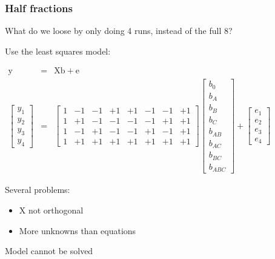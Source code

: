 \begin{frame}\frametitle{Half fractions}

	What do we loose by only doing 4 runs, instead of the full 8?

	Use the least squares model:

	$
	\begin{array}{rcl}
		\mathrm{y} &=& \mathrm{X} \mathrm{b} + \mathrm{e}\\
		\begin{bmatrix}
			y_1\\
			y_2\\
			y_3 \\
			y_4
		\end{bmatrix}
		&=&
		\begin{bmatrix}
			1 & -1 & -1 & +1 & +1 & -1 & -1 & +1\\
			1 & +1 & -1 & -1 & -1 & -1 & +1 & +1\\
			1 & -1 & +1 & -1 & -1 & +1 & -1 & +1\\
			1 & +1 & +1 & +1 & +1 & +1 & +1 & +1
		\end{bmatrix}
		\begin{bmatrix}
			b_0 \\
			b_A \\
			b_B \\
			b_{C} \\
			b_{AB} \\
			b_{AC} \\
			b_{BC} \\
			b_{ABC}
		\end{bmatrix}
		+
		\begin{bmatrix}
			e_1\\
			e_2\\
			e_3 \\
			e_4
		\end{bmatrix}
	\end{array}
	$

	Several problems:
	\begin{itemize}
		\item	$\mathrm{X}$ not orthogonal
		\item	More unknowns than equations
	\end{itemize}
	Model cannot be solved
\end{frame}

